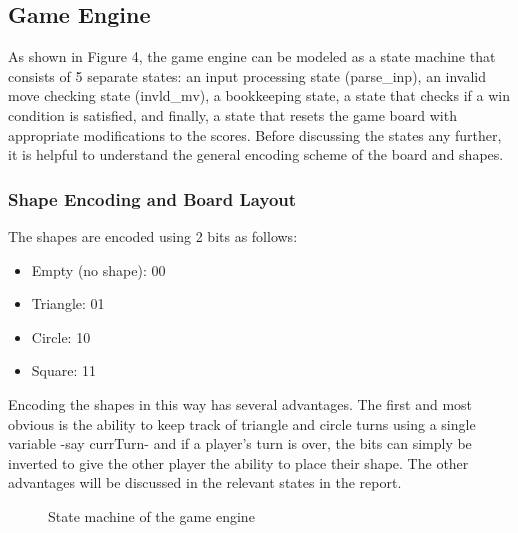 \documentclass[conference]{IEEEtran}
\begin{document}
\subsection{Game Engine}
As shown in Figure 4, the game engine can be modeled as a state machine that consists of 5 separate states: an input processing state (parse\_inp), an invalid move checking state (invld\_mv), a bookkeeping state, a state that checks if a win condition is satisfied, and finally, a state that resets the game board with appropriate modifications to the scores. Before discussing the states any further, it is helpful to understand the general encoding scheme of the board and shapes. \\
\subsubsection{Shape Encoding and Board Layout}
\par  The shapes are encoded using 2 bits as follows:
\begin{itemize}
  \item Empty (no shape): 00
  \item Triangle: 01
  \item Circle: 10
  \item Square: 11
\end{itemize}
\par Encoding the shapes in this way has several advantages. The first and most obvious is the ability to keep track of triangle and circle turns using a single variable -say currTurn- and if a player’s turn is over, the bits can simply be inverted to give the other player the ability to place their shape. The other advantages will be discussed in the relevant states in the report.
   \begin{figure}
   \centering {}
   \caption{State machine of the game engine}
   \end{figure}
\end{document}
